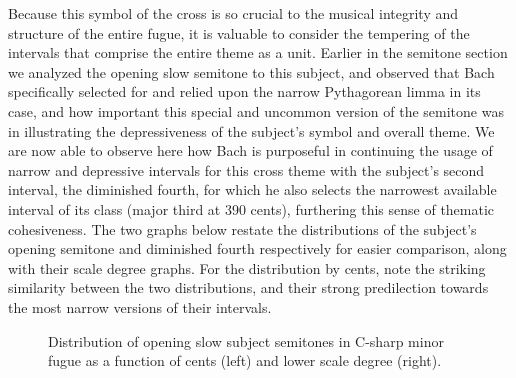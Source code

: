 Because this symbol of the cross is so crucial to the musical integrity
and structure of the entire fugue, it is valuable to consider the
tempering of the intervals that comprise the entire theme as a unit.
Earlier in the semitone section we analyzed the opening slow semitone to
this subject, and observed that Bach specifically selected for and
relied upon the narrow Pythagorean limma in its case, and how important
this special and uncommon version of the semitone was in illustrating
the depressiveness of the subject's symbol and overall theme. We are now
able to observe here how Bach is purposeful in continuing the usage of
narrow and depressive intervals for this cross theme with the subject's
second interval, the diminished fourth, for which he also selects the
narrowest available interval of its class (major third at 390 cents),
furthering this sense of thematic cohesiveness. The two graphs below
restate the distributions of the subject's opening semitone and
diminished fourth respectively for easier comparison, along with their
scale degree graphs. For the distribution by cents, note the striking
similarity between the two distributions, and their strong predilection
towards the most narrow versions of their intervals.



\begin{figure}[H]
\vspace{1.5em}
    \centering
    \caption[Distribution of opening slow subject semitones in C-sharp minor fugue as a function of cents and lower scale degree. ]{Distribution of opening slow subject semitones in C-sharp minor fugue as a function of cents (left) and lower scale degree (right).}
\end{figure}


